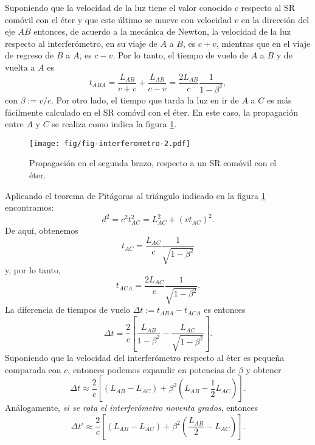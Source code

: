 Suponiendo que la velocidad de la luz tiene el valor conocido $c$ respecto al SR comóvil con el éter y que este último se mueve con velocidad $v$ en la dirección del eje $AB$ entonces, de acuerdo a la mecánica de Newton, la velocidad de la luz respecto al interferómetro, en su viaje de $A$ a $B$, es $c+v$, mientras que en el viaje de regreso de $B$ a $A$, es $c-v$. Por lo tanto, el tiempo de vuelo de $A$ a $B$ y de vuelta a $A$ es
\begin{equation} \label{eq:michelson1}
t_{ABA}=\frac{L_{AB}}{c+v}+\frac{L_{AB}}{c-v}=\frac{2L_{AB}}{c}\frac{1}{1-\beta^2},
\end{equation}
con $\beta:=v/c$. Por otro lado, el tiempo que tarda la luz en ir de $A$ a $C$ es más fácilmente calculado en el SR comóvil con el éter. En este caso, la propagación entre $A$ y $C$ se realiza como indica la figura \ref{fig:michelson2}.
\begin{figure}[H]
\begin{center}
\texttt{[image: fig/fig-interferometro-2.pdf]}
\end{center}
\caption{Propagación en el segunda brazo, respecto a un SR comóvil con el éter.} \label{fig:michelson2}
\end{figure}
Aplicando el teorema de Pitágoras al triángulo indicado en la figura \ref{fig:michelson2} encontramos:
\begin{equation}\label{eq:michelson2}
 d^2=c^2t_{AC}^2=L_{AC}^2+(vt_{AC})^2.
\end{equation}
De aquí, obtenemos
\begin{equation}
 t_{AC}=\frac{L_{AC}}{c}\frac{1}{\sqrt{1-\beta^2}}
\end{equation}
y, por lo tanto,
\begin{equation} \label{eq:michelson4}
t_{ACA}=\frac{2L_{AC}}{c}\frac{1}{\sqrt{1-\beta^2}}.
\end{equation}
La diferencia de tiempos de vuelo $\Delta t:=t_{ABA}-t_{ACA}$ es entonces
\begin{equation} \label{eq:michelson5}
\Delta t=\frac{2}{c}\left[\frac{L_{AB}}{1-\beta^2}-\frac{L_{AC}}{\sqrt{1-\beta^2}}\right].
\end{equation}
Suponiendo que la velocidad del interferómetro respecto al éter es pequeña comparada con $c$, entonces podemos expandir en potencias de $\beta$ y obtener
\begin{equation} \label{eq:michelson6}
\Delta t\approx\frac{2}{c}\left[(L_{AB}-L_{AC})+\beta^2(L_{AB}-\frac{1}{2}L_{AC})\right].
\end{equation}
Análogamente, \textit{si se rota el interferómetro noventa grados}, entonces 
\begin{equation}
\Delta t'\approx\frac{2}{c}\left[(L_{AB}-L_{AC})+\beta^2(\frac{L_{AB}}{2}-L_{AC})\right].
\end{equation}

